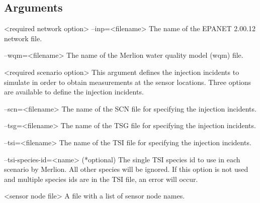 \subsection{Arguments}\label{measuregenArguments}
\begin{unknownListing}
     <required network option>
     --inp=<filename>                   
     The name of the EPANET 2.00.12 network file.
     
     --wqm=<filename>                   
     The name of the Merlion water quality model (wqm) file.
 
     <required scenario option>
     This argument defines the injection incidents to simulate in order 
     to obtain measurements at the sensor locations. Three options are 
     available to define the injection incidents.
     
     --scn=<filename>                   
     The name of the SCN file for specifying the injection incidents.
     
     --tsg=<filename>                   
     The name of the TSG file for specifying the injection incidents.
	
     --tsi=<filename>                   
     The name of the TSI file for specifying the injection incidents.
	 
     --tsi-species-id=<name>        
     (*optional) The single TSI species id to use in each scenario by Merlion. All other species 
     will be ignored. If this option is not used and multiple species ids are in the TSI
     file, an error will occur.
     
     <sensor node file>
     A file with a list of sensor node names.
\end{unknownListing}
